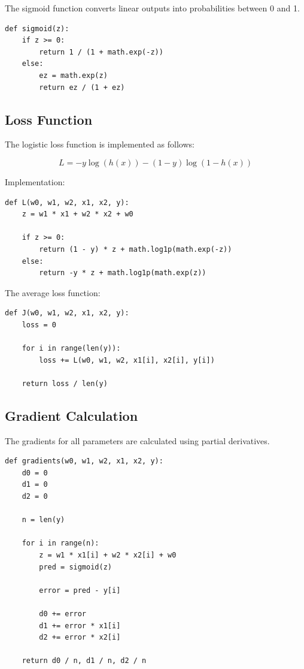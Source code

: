 \documentclass{article}
\begin{document}
The sigmoid function converts linear outputs into probabilities between 0 and 1.

\begin{lstlisting}
def sigmoid(z):
    if z >= 0:
        return 1 / (1 + math.exp(-z))
    else:
        ez = math.exp(z)
        return ez / (1 + ez)
\end{lstlisting}

\subsection{Loss Function}

The logistic loss function is implemented as follows:

\[
L = -y\log(h(x)) - (1-y)\log(1-h(x))
\]

Implementation:

\begin{lstlisting}
def L(w0, w1, w2, x1, x2, y):
    z = w1 * x1 + w2 * x2 + w0

    if z >= 0:
        return (1 - y) * z + math.log1p(math.exp(-z))
    else:
        return -y * z + math.log1p(math.exp(z))
\end{lstlisting}

The average loss function:

\begin{lstlisting}
def J(w0, w1, w2, x1, x2, y):
    loss = 0

    for i in range(len(y)):
        loss += L(w0, w1, w2, x1[i], x2[i], y[i])

    return loss / len(y)
\end{lstlisting}

\subsection{Gradient Calculation}

The gradients for all parameters are calculated using partial derivatives.

\begin{lstlisting}
def gradients(w0, w1, w2, x1, x2, y):
    d0 = 0
    d1 = 0
    d2 = 0

    n = len(y)

    for i in range(n):
        z = w1 * x1[i] + w2 * x2[i] + w0
        pred = sigmoid(z)

        error = pred - y[i]

        d0 += error
        d1 += error * x1[i]
        d2 += error * x2[i]

    return d0 / n, d1 / n, d2 / n
\end{lstlisting}
\end{document}
